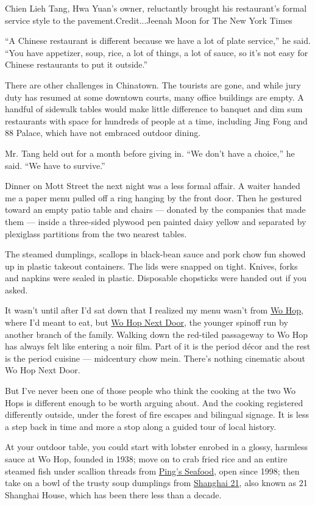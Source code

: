 Chien Lieh Tang, Hwa Yuan's owner, reluctantly brought his restaurant's
formal service style to the pavement.Credit...Jeenah Moon for The New
York Times

``A Chinese restaurant is different because we have a lot of plate
service,'' he said. ``You have appetizer, soup, rice, a lot of things, a
lot of sauce, so it's not easy for Chinese restaurants to put it
outside.''

There are other challenges in Chinatown. The tourists are gone, and
while jury duty has resumed at some downtown courts, many office
buildings are empty. A handful of sidewalk tables would make little
difference to banquet and dim sum restaurants with space for hundreds of
people at a time, including Jing Fong and 88 Palace, which have not
embraced outdoor dining.

Mr. Tang held out for a month before giving in. ``We don't have a
choice,'' he said. ``We have to survive.''

Dinner on Mott Street the next night was a less formal affair. A waiter
handed me a paper menu pulled off a ring hanging by the front door. Then
he gestured toward an empty patio table and chairs --- donated by the
companies that made them --- inside a three-sided plywood pen painted
daisy yellow and separated by plexiglass partitions from the two nearest
tables.

The steamed dumplings, scallops in black-bean sauce and pork chow fun
showed up in plastic takeout containers. The lids were snapped on tight.
Knives, forks and napkins were sealed in plastic. Disposable chopsticks
were handed out if you asked.

It wasn't until after I'd sat down that I realized my menu wasn't from
\href{https://www.wohop17.com/}{Wo Hop}, where I'd meant to eat, but
\href{https://www.wohop15.com/menu}{Wo Hop Next Door}, the younger
spinoff run by another branch of the family. Walking down the red-tiled
passageway to Wo Hop has always felt like entering a noir film. Part of
it is the period décor and the rest is the period cuisine --- midcentury
chow mein. There's nothing cinematic about Wo Hop Next Door.

But I've never been one of those people who think the cooking at the two
Wo Hops is different enough to be worth arguing about. And the cooking
registered differently outside, under the forest of fire escapes and
bilingual signage. It is less a step back in time and more a stop along
a guided tour of local history.

At your outdoor table, you could start with lobster enrobed in a glossy,
harmless sauce at Wo Hop, founded in 1938; move on to crab fried rice
and an entire steamed fish under scallion threads from
\href{https://www.nytimes3xbfgragh.onion/2000/08/09/dining/restaurants-diners-and-dinner-exchanging-glances.html?searchResultPosition=1}{Ping's
Seafood}, open since 1998; then take on a bowl of the trusty soup
dumplings from \href{https://shanghai21togo.com/\#}{Shanghai 21}, also
known as 21 Shanghai House, which has been there less than a decade.

